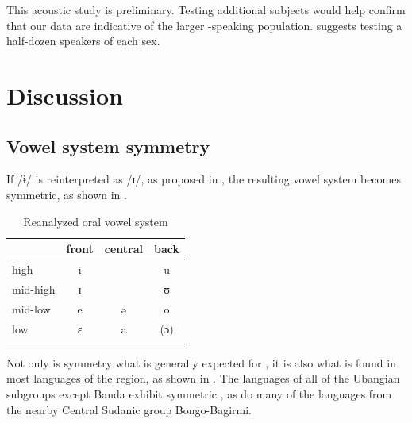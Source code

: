 \documentclass[output=paper,colorlinks,citecolor=brown]{langscibook}
\begin{document}
This acoustic study  is preliminary. Testing additional subjects would help confirm that our data are indicative of the larger -speaking population. \citet{Ladefoged2003} suggests testing a half-dozen speakers of each sex.

\section{Discussion}\label{sec:olson:4}

\subsection{Vowel system symmetry}

If /ɨ/ is reinterpreted as /ɪ/, as proposed in , the resulting  vowel system  becomes  symmetric, as shown in .

\begin{table}
\caption{Reanalyzed  oral vowel system}
\label{tab:olson:10}
    \begin{tabular}{lccc}
    \lsptoprule
                    & front & central   & back\\
    \midrule
        high        & i     &           & u\\
        mid-high    & ɪ     &           & ʊ\\
        mid-low     & e     & ə         & o\\
        low         & ɛ     & a         & (ɔ)\\
    \lspbottomrule
    \end{tabular}
\end{table}

Not only is symmetry what is generally expected for  \citep[59]{Pike1947}, it is also what is found in most languages of the region, as shown in . The languages of all of the Ubangian  subgroups except Banda  exhibit symmetric  , as do many of the languages from the nearby Central Sudanic  group  Bongo-Bagirmi.
\end{document}
